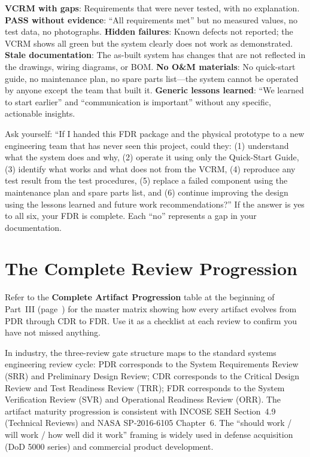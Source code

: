 \documentclass[11pt,letterpaper,twoside,openany]{book}
\begin{document}
\begin{warningbox}
\textbf{VCRM with gaps}: Requirements that were never tested, with no explanation. \textbf{PASS without evidence}: ``All requirements met'' but no measured values, no test data, no photographs. \textbf{Hidden failures}: Known defects not reported; the VCRM shows all green but the system clearly does not work as demonstrated. \textbf{Stale documentation}: The as-built system has changes that are not reflected in the drawings, wiring diagrams, or BOM. \textbf{No O\&M materials}: No quick-start guide, no maintenance plan, no spare parts list---the system cannot be operated by anyone except the team that built it. \textbf{Generic lessons learned}: ``We learned to start earlier'' and ``communication is important'' without any specific, actionable insights.
\end{warningbox}

\begin{tipbox}
Ask yourself: ``If I handed this FDR package and the physical prototype to a new engineering team that has never seen this project, could they: (1) understand what the system does and why, (2) operate it using only the Quick-Start Guide, (3) identify what works and what does not from the VCRM, (4) reproduce any test result from the test procedures, (5) replace a failed component using the maintenance plan and spare parts list, and (6) continue improving the design using the lessons learned and future work recommendations?'' If the answer is yes to all six, your FDR is complete. Each ``no'' represents a gap in your documentation.
\end{tipbox}

\FloatBarrier
\section{The Complete Review Progression}

Refer to the \textbf{Complete Artifact Progression} table at the beginning of Part~III (page~\pageref{fig:reviews}) for the master matrix showing how every artifact evolves from PDR through CDR to FDR. Use it as a checklist at each review to confirm you have not missed anything.

\begin{tipbox}
In industry, the three-review gate structure maps to the standard systems engineering review cycle: PDR corresponds to the System Requirements Review (SRR) and Preliminary Design Review; CDR corresponds to the Critical Design Review and Test Readiness Review (TRR); FDR corresponds to the System Verification Review (SVR) and Operational Readiness Review (ORR). The artifact maturity progression is consistent with INCOSE SEH Section~4.9 (Technical Reviews) and NASA SP-2016-6105 Chapter~6. The ``should work / will work / how well did it work'' framing is widely used in defense acquisition (DoD 5000 series) and commercial product development.
\end{tipbox}
\end{document}
